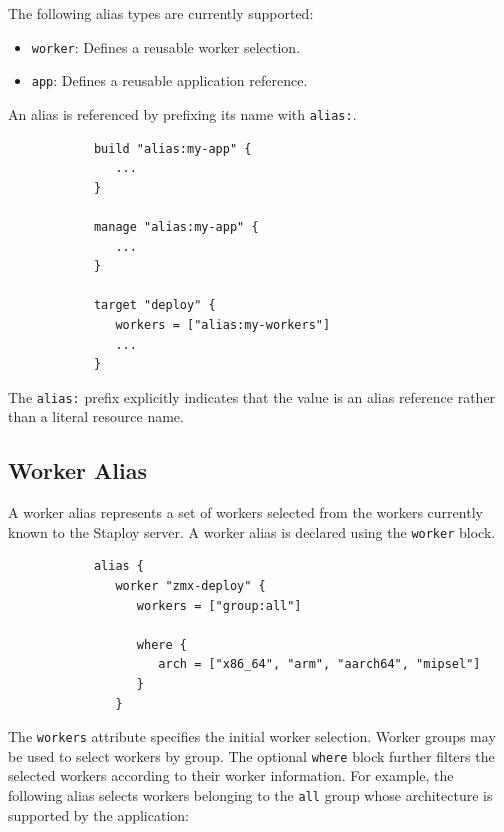 \documentclass[11pt,a4paper]{article}
\begin{document}
    The following alias types are currently supported:

    \begin{itemize}
        \item \texttt{worker}: Defines a reusable worker selection.
        \item \texttt{app}: Defines a reusable application reference.
    \end{itemize}

    An alias is referenced by prefixing its name with \texttt{alias:}.

    \begin{center}
        \begin{verbatim}
            build "alias:my-app" {
               ...
            }

            manage "alias:my-app" {
               ...
            }

            target "deploy" {
               workers = ["alias:my-workers"]
               ...
            }
        \end{verbatim}
    \end{center}

    The \texttt{alias:} prefix explicitly indicates that the value is an alias reference rather than a literal resource name.

    \subsection{Worker Alias}\label{subsec:worker-alias}

    A worker alias represents a set of workers selected from the workers currently known to the Staploy server.
    A worker alias is declared using the \texttt{worker} block.

    \begin{center}
        \begin{verbatim}
            alias {
               worker "zmx-deploy" {
                  workers = ["group:all"]

                  where {
                     arch = ["x86_64", "arm", "aarch64", "mipsel"]
                  }
               }
        \end{verbatim}
    \end{center}

    The \texttt{workers} attribute specifies the initial worker selection.
    Worker groups may be used to select workers by group.
    The optional \texttt{where} block further filters the selected workers according to their worker information.
    For example, the following alias selects workers belonging to the \texttt{all} group whose architecture is supported by the application:
\end{document}

